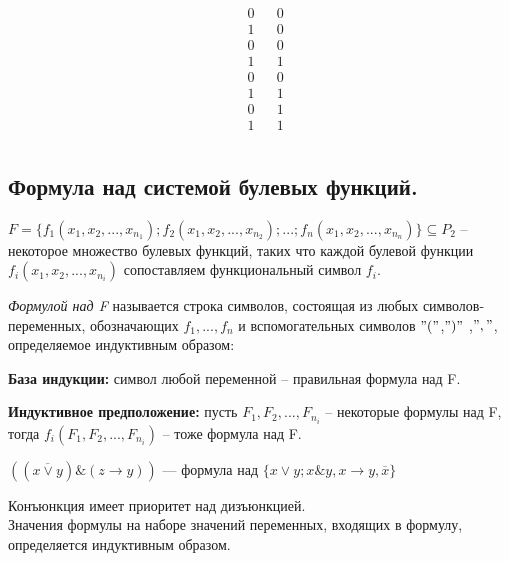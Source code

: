 \begin{enumerate}
$$\begin{array}{rrr|c}
	&
	\begin{array}{r}
	0\\ 1\\ 0\\ 1\\ 0\\ 1\\ 0\\ 1\\
	\end{array}
	&
	\begin{array}{r}
	0\\ 0\\ 0\\ 1\\ 0\\ 1\\ 1\\ 1\\
	\end{array}
	\end{array}
	$$
\end{enumerate}	


\subsection{Формула над системой булевых функций.}
$F=\{f_{1}(x_{1},x_{2},...,x_{n_1});f_{2}(x_{1},x_{2},...,x_{n_2});...;f_{n}(x_{1},x_{2},...,x_{n_n})\}\subseteq P_2$ -- некоторое множество булевых функций, таких что каждой булевой функции $f_{i}(x_{1},x_{2},...,x_{n_i})$ сопоставляем функциональный символ $f_{i}$.
\begin{definition}

	\textit{Формулой над F} называется строка символов, состоящая из любых символов-переменных, обозначающих $f_1,...,f_n$ и вспомогательных символов $"("$,$")"$ ,$","$, определяемое индуктивным образом: 

\textbf{База индукции:} символ любой переменной -- правильная формула над F.

\textbf{Индуктивное предположение: } пусть $F_1,F_2,...,F_{n_i}$ -- некоторые формулы над F, тогда $f_i(F_1,F_2,...,F_{n_i})$ -- тоже формула над F.

\end{definition}
\begin{example}
	$((\overline{x\vee y}) \& (z\rightarrow y ))$ --- формула над $\{x \vee y; x \& y, x \rightarrow y, \overline{x} \}$\\
\end{example}
Конъюнкция имеет приоритет над дизъюнкцией.\\
\newpage
Значения формулы на наборе значений переменных, входящих в формулу, определяется индуктивным образом.

